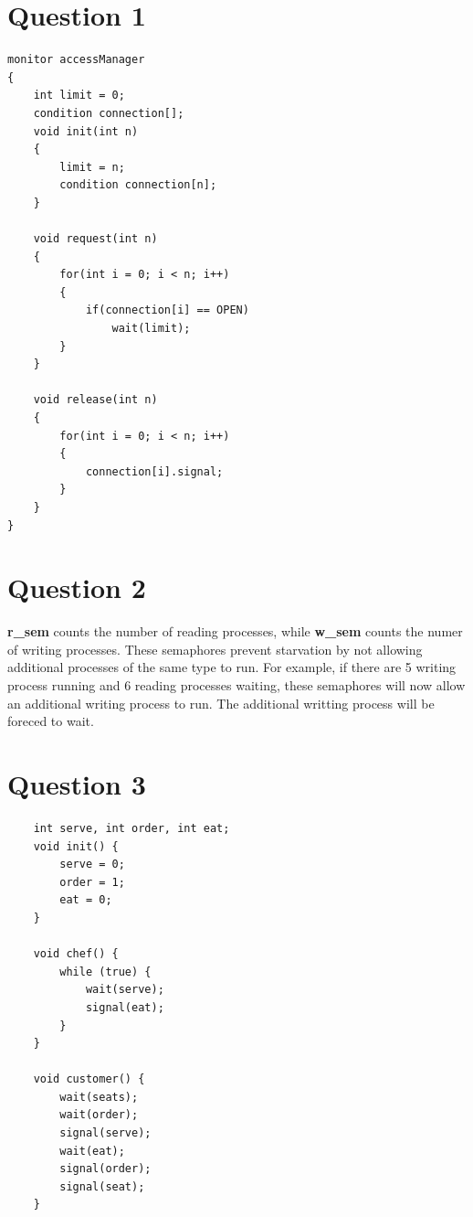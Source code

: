 \documentclass[11pt]{article}
\begin{document}
\maketitle

\section*{Question 1}
\begin{verbatim}
monitor accessManager
{
    int limit = 0;
    condition connection[];
    void init(int n)
    {
        limit = n;
        condition connection[n];
    }

    void request(int n)
    {
        for(int i = 0; i < n; i++)
        {
            if(connection[i] == OPEN)
                wait(limit);
        }
    }

    void release(int n)
    {
        for(int i = 0; i < n; i++)
        {
            connection[i].signal;
        }
    }
}
\end{verbatim}
\section*{Question 2}
    \textbf{r\_sem} counts the number of reading processes, 
    while \textbf{w\_sem} counts the numer of writing processes.
    These semaphores prevent starvation by not allowing additional
    processes of the same type to run. For example, if there are 
    5 writing process running and 6 reading processes waiting, 
    these semaphores will now allow an additional writing process 
    to run. The additional writting process will be foreced to wait.
\section*{Question 3}
\begin{verbatim}
    int serve, int order, int eat;
    void init() {
        serve = 0;
        order = 1;
        eat = 0;
    }
    
    void chef() {
        while (true) {
            wait(serve);
            signal(eat);
        }
    }
    
    void customer() {
        wait(seats);
        wait(order); 
        signal(serve);
        wait(eat); 
        signal(order);
        signal(seat); 
    }
\end{verbatim}
\newpage
\end{document}
